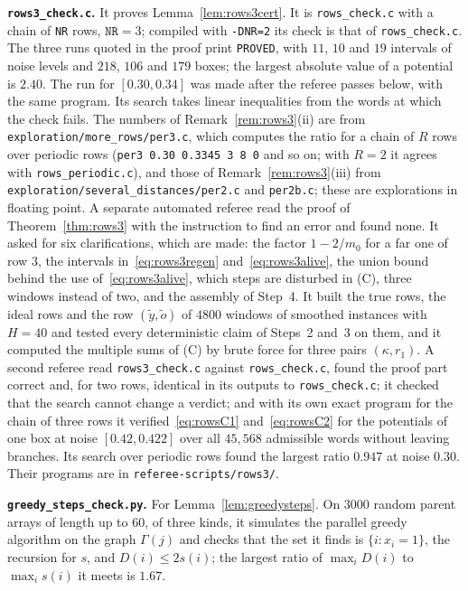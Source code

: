 \documentclass[11pt]{amsart}
\theoremstyle{definition}
\theoremstyle{remark}
\begin{document}
\medskip\noindent\textbf{\texttt{rows3\_check.c}.} It proves Lemma~\ref{lem:rows3cert}. It is
\texttt{rows\_check.c} with a chain of \texttt{NR} rows, $\texttt{NR}=3$; compiled with
\texttt{-DNR=2} its check is that of \texttt{rows\_check.c}. The three runs quoted in the proof print
\texttt{PROVED}, with $11$, $10$ and $19$ intervals of noise levels and $218$, $106$ and $179$
boxes; the largest absolute value of a potential is $2.40$. The run for $[0.30,0.34]$ was made
after the referee passes below, with the same program. Its search
takes linear inequalities from the words at which the check fails. The numbers of
Remark~\ref{rem:rows3}(ii) are from \texttt{exploration/more\_rows/per3.c}, which computes the
ratio for a chain of $R$ rows over periodic rows (\texttt{per3 0.30 0.3345 3 8 0} and so on; with
$R=2$ it agrees with \texttt{rows\_periodic.c}), and those of Remark~\ref{rem:rows3}(iii) from
\texttt{exploration/several\_distances/per2.c} and \texttt{per2b.c}; these are explorations in
floating point. A separate automated referee read the proof of Theorem~\ref{thm:rows3} with the
instruction to find an error and found none. It asked for six clarifications, which are made:
the factor $1-2/m_0$ for a far one of row $3$, the intervals in~\eqref{eq:rows3regen}
and~\eqref{eq:rows3alive}, the union bound behind the use of~\eqref{eq:rows3alive}, which steps
are disturbed in (C), three windows instead of two, and the assembly of Step~4. It built the true
rows, the ideal rows and the row $(\tilde y,\tilde o)$ of $4800$ windows of smoothed instances
with $H=40$ and tested every deterministic claim of Steps~2 and~3 on them, and it computed the
multiple sums of (C) by brute force for three pairs $(\kappa,r_1)$. A second referee read
\texttt{rows3\_check.c} against \texttt{rows\_check.c}, found the proof part correct and, for
two rows, identical in its outputs to \texttt{rows\_check.c}; it checked that the search cannot
change a verdict; and with its own exact program for the chain of three rows it
verified~\eqref{eq:rowsC1} and~\eqref{eq:rowsC2} for the potentials of one box at noise
$[0.42,0.422]$ over all $45{,}568$ admissible words without leaving branches. Its search over
periodic rows found the largest ratio $0.947$ at noise $0.30$. Their programs are in
\texttt{referee-scripts/rows3/}.

\medskip\noindent\textbf{\texttt{greedy\_steps\_check.py}.} For Lemma~\ref{lem:greedysteps}. On
$3000$ random parent arrays of length up to $60$, of three kinds, it simulates the parallel greedy
algorithm on the graph $\Gamma(j)$ and checks that the set it finds is $\{i:x_i=1\}$, the recursion
for $s$, and $D(i)\le2s(i)$; the largest ratio of $\max_iD(i)$ to $\max_is(i)$ it meets is $1.67$.
\end{document}
